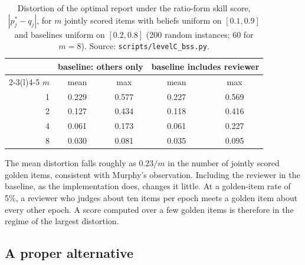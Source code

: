\begin{table}[t]
\centering\small
\caption{Distortion of the optimal report under the ratio-form skill score, $|p^*_j-q_j|$,
for $m$ jointly scored items with beliefs uniform on $[0.1,0.9]$ and baselines uniform on
$[0.2,0.8]$ (200 random instances; 60 for $m=8$). Source: \texttt{scripts/levelC\_bss.py}.}
\label{tab:bss}
\begin{tabular}{@{}rcccc@{}}
\toprule
& \multicolumn{2}{c}{baseline: others only} & \multicolumn{2}{c}{baseline includes reviewer}\\
\cmidrule(lr){2-3}\cmidrule(l){4-5}
$m$ & mean & max & mean & max\\
\midrule
1 & 0.229 & 0.577 & 0.227 & 0.569\\
2 & 0.127 & 0.434 & 0.118 & 0.416\\
4 & 0.061 & 0.173 & 0.061 & 0.227\\
8 & 0.030 & 0.081 & 0.035 & 0.095\\
\bottomrule
\end{tabular}
\end{table}

\begin{finding}\label{find:bss}\empirical{}
The mean distortion falls roughly as $0.23/m$ in the number of jointly scored golden items,
consistent with Murphy's observation. Including the reviewer in the baseline, as the
implementation does, changes it little. At a golden-item rate of 5\%, a reviewer who judges about
ten items per epoch meets a golden item about every other epoch. A score computed over a few
golden items is therefore in the regime of the largest distortion.
\end{finding}

\subsection{A proper alternative}

